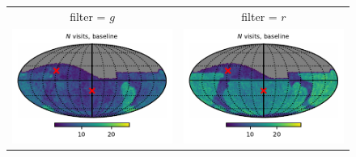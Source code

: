 \documentclass[preprintm,linenumbers]{aastex631}
\begin{document}
\begin{figure}
   		\centering
			\begin{tabular}{@{}c@{}c@{}}
          filter = $g$ &  filter = $r$\\
   		\includegraphics{results/skymaps_cutout/skymaps_cutout_first_year_one_snap_v4_0_10yrs_db_noDD_noTwi_nside-256_CountMetric_g_noDD_noTwi.pdf} &
   		\includegraphics{results/skymaps_cutout/skymaps_cutout_first_year_one_snap_v4_0_10yrs_db_noDD_noTwi_nside-256_CountMetric_r_noDD_noTwi.pdf} \\


\end{tabular}
\end{figure}
\end{document}
